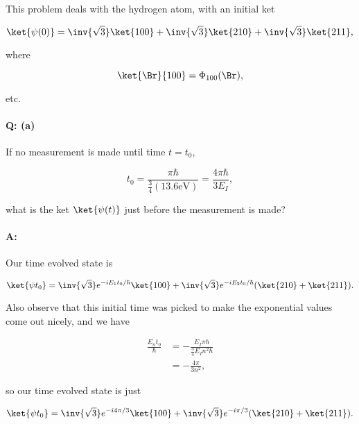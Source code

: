 This problem deals with the hydrogen atom, with an initial ket

\begin{equation}\label{eqn:qmIexamPractice2007Dec:4:10}
\ket{\psi(0)} = 
\inv{\sqrt{3}} \ket{100}
+\inv{\sqrt{3}} \ket{210}
+\inv{\sqrt{3}} \ket{211},
\end{equation}

where 

\begin{equation}\label{eqn:qmIexamPractice2007Dec:4:20}
\ket{\Br}{100} = \Phi_{100}(\Br),
\end{equation}

etc.

\paragraph{Q: (a)}

If no measurement is made until time $t = t_0$,

\begin{equation}\label{eqn:qmIexamPractice2007Dec:4:30}
t_0 = \frac{\pi \hbar}{ \frac{3}{4} (13.6 \text{eV}) } = \frac{ 4 \pi \hbar }{ 3 E_I},
\end{equation}

what is the ket $\ket{\psi(t)}$ just before the measurement is made?

\paragraph{A:}

Our time evolved state is 

\begin{equation}\label{eqn:qmIexamPractice2007Dec:4:n}
\ket{\psi{t_0}} = 
\inv{\sqrt{3}} e^{-i E_1 t_0 /\hbar } \ket{100}
+\inv{\sqrt{3}} e^{- i E_2 t_0/\hbar } 
(\ket{210} + \ket{211}).
\end{equation}

Also observe that this initial time was picked to make the exponential values come out nicely, and we have

\begin{align*}
\frac{E_n t_0 }{\hbar} 
&= - \frac{E_I \pi \hbar }{\frac{3}{4} E_I n^2 \hbar} \\
&= - \frac{4 \pi }{ 3 n^2 },
\end{align*}

so our time evolved state is just

\begin{equation}\label{eqn:qmIexamPractice2007Dec:4:100}
\ket{\psi{t_0}} = 
\inv{\sqrt{3}} e^{-i 4 \pi / 3} \ket{100}
+\inv{\sqrt{3}} e^{- i \pi / 3 } 
(\ket{210} + \ket{211}).
\end{equation}

